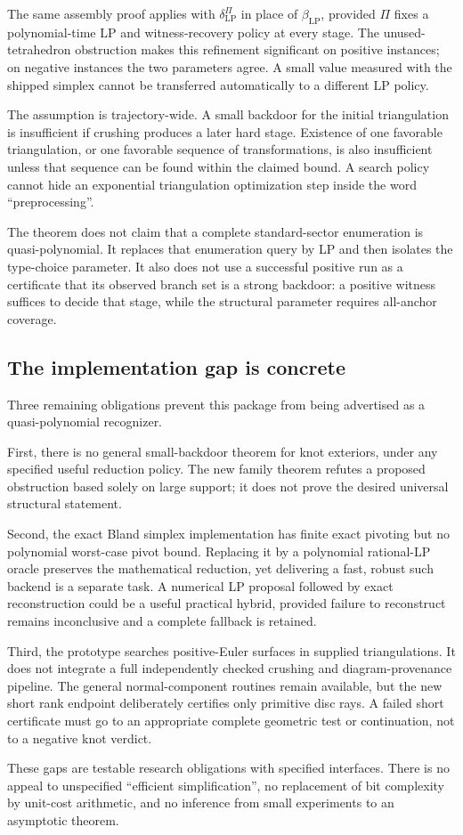 The same assembly proof applies with $\delta_{\mathrm{LP}}^{\Pi}$ in place of $\beta_{\mathrm{LP}}$, provided $\Pi$ fixes a polynomial-time LP and witness-recovery policy at every stage. The unused-tetrahedron obstruction makes this refinement significant on positive instances; on negative instances the two parameters agree. A small value measured with the shipped simplex cannot be transferred automatically to a different LP policy.

The assumption is trajectory-wide. A small backdoor for the initial triangulation is insufficient if crushing produces a later hard stage. Existence of one favorable triangulation, or one favorable sequence of transformations, is also insufficient unless that sequence can be found within the claimed bound. A search policy cannot hide an exponential triangulation optimization step inside the word ``preprocessing''.

The theorem does not claim that a complete standard-sector enumeration is quasi-polynomial. It replaces that enumeration query by LP and then isolates the type-choice parameter. It also does not use a successful positive run as a certificate that its observed branch set is a strong backdoor: a positive witness suffices to decide that stage, while the structural parameter requires all-anchor coverage.

\subsection{The implementation gap is concrete}

Three remaining obligations prevent this package from being advertised as a quasi-polynomial recognizer.

First, there is no general small-backdoor theorem for knot exteriors, under any specified useful reduction policy. The new family theorem refutes a proposed obstruction based solely on large support; it does not prove the desired universal structural statement.

Second, the exact Bland simplex implementation has finite exact pivoting but no polynomial worst-case pivot bound. Replacing it by a polynomial rational-LP oracle preserves the mathematical reduction, yet delivering a fast, robust such backend is a separate task. A numerical LP proposal followed by exact reconstruction could be a useful practical hybrid, provided failure to reconstruct remains inconclusive and a complete fallback is retained.

Third, the prototype searches positive-Euler surfaces in supplied triangulations. It does not integrate a full independently checked crushing and diagram-provenance pipeline. The general normal-component routines remain available, but the new short rank endpoint deliberately certifies only primitive disc rays. A failed short certificate must go to an appropriate complete geometric test or continuation, not to a negative knot verdict.

These gaps are testable research obligations with specified interfaces. There is no appeal to unspecified ``efficient simplification'', no replacement of bit complexity by unit-cost arithmetic, and no inference from small experiments to an asymptotic theorem.
